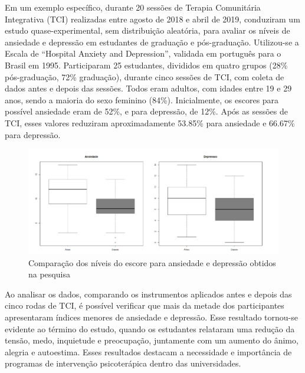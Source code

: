Em um exemplo específico, durante 20 sessões de Terapia Comunitária Integrativa (TCI) realizadas entre agosto de 2018 e abril de 2019, \cite{BOARETTO} conduziram um estudo quase-experimental, sem distribuição aleatória, para avaliar os níveis de ansiedade e depressão em estudantes de graduação e pós-graduação. Utilizou-se a Escala de “Hospital Anxiety and Depression”, validada em português para o Brasil em 1995. Participaram 25 estudantes, divididos em quatro grupos (28\% pós-graduação, 72\% graduação), durante cinco sessões de TCI, com coleta de dados antes e depois das sessões. Todos eram adultos, com idades entre 19 e 29 anos, sendo a maioria do sexo feminino (84\%). Inicialmente, os escores para possível ansiedade eram de 52\%, e para depressão, de 12\%. Após as sessões de TCI, esses valores reduziram aproximadamente 53.85\% para ansiedade e 66.67\% para depressão.

\begin{figure}[!h] %
    \centering
    \includegraphics[scale=0.5]{latex/figuras/boaretto.pdf}
    \caption[Terapia Comunitária Integrativa]%
    {Comparação dos níveis do escore para ansiedade e depressão obtidos na pesquisa\cite{BOARETTO}}%
\end{figure}

Ao analisar os dados, comparando os instrumentos aplicados antes e depois das cinco rodas de TCI, é possível verificar que mais da metade dos participantes apresentaram índices menores de ansiedade e depressão. Esse resultado tornou-se evidente ao término do estudo, quando os estudantes relataram uma redução da tensão, medo, inquietude e preocupação, juntamente com um aumento do ânimo, alegria e autoestima. Esses resultados destacam a necessidade e importância de programas de intervenção psicoterápica dentro das universidades.\cite{BOARETTO}

